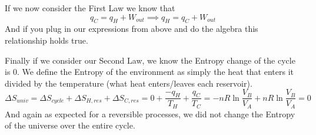 \documentclass{article}
\newcommand{\be}{\begin{equation}}
\newcommand{\ee}{\end{equation}}
\begin{document}
If we now consider the First Law we know that 
\be
q_C = q_H + W_{out} \implies q_H = q_C + W_{out}
\ee
And if you plug in our expressions from above and do the algebra this relationship holds true. 

Finally if we consider our Second Law, we know the Entropy change of the cycle is 0.
We define the Entropy of the environment as simply the heat that enters it divided by the temperature (what heat enters/leaves each reservoir). 
\be
\Delta S_{univ} = \Delta S_{cycle} + \Delta S_{H,res} + \Delta S_{C,res} = 0 + \frac{-q_H}{T_H} + \frac{q_C}{T_C} = -nR\ln\frac{V_B}{V_A} + nR\ln\frac{V_B}{V_A} = 0
\ee
And again as expected for a reversible processes, we did not change the Entropy of the universe over the entire cycle. 
\end{document}
